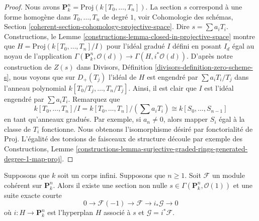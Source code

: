 \begin{proof}
Nous avons $\mathbf{P}^n_k = \text{Proj}(k[T_0,
\ldots, T_n])$. La section $s$ correspond à une
forme homogène dans $T_0, \ldots, T_n$ de degré
$1$, voir Cohomologie des schémas, Section
\ref{coherent-section-cohomology-projective-space}.
Dire $s = \sum a_i T_i$. Constructions, le Lemme
\ref{constructions-lemma-closed-in-projective-space}
montre que $H = \text{Proj}(k[T_0, \ldots, T_n]/I)$
pour l'idéal gradué $I$ défini en posant $I_d$ égal
au noyau de l'application $\Gamma(\mathbf{P}^n_k,
\mathcal{O}(d)) \to \Gamma(H, i^*\mathcal{O}(d))$.
D'après notre construction de $Z(s)$ dans Divisors,
Définition \ref{divisors-definition-zero-scheme-s},
nous voyons que sur $D_{+}(T_j)$ l'idéal de $H$ est
engendré par $\sum a_i T_i/T_j$ dans l'anneau polynomial
$k[T_0/T_j, \ldots, T_n/T_j]$. Ainsi, il est clair que
$I$ est l'idéal engendré par $\sum a_i T_i$. Remarquez que
$$
k[T_0, \ldots, T_n]/I = k[T_0, \ldots, T_n]/(\sum a_i T_i) \cong
k[S_0, \ldots, S_{n - 1}]
$$
en tant qu'anneaux gradués. Par exemple, si $a_n \not = 0$,
alors mapper $S_i$ égal à la classe de $T_i$ fonctionne.
Nous obtenons l'isomorphisme désiré par fonctorialité de
$\text{Proj}$. L'égalité des torsions de faisceaux de
structure découle par exemple des Constructions, Lemme
\ref{constructions-lemma-surjective-graded-rings-generated-degree-1-map-proj}.
\end{proof}

\begin{lemma}
\label{lemma-exact-sequence-induction}
Supposons que $k$ soit un corps infini.
Supposons que $n \geq 1$. Soit $\mathcal{F}$ un
module cohérent sur $\mathbf{P}^n_k$. Alors il
existe une section non nulle $s \in
\Gamma(\mathbf{P}^n_k, \mathcal{O}(1))$ et une suite exacte courte
$$
0 \to \mathcal{F}(-1) \to \mathcal{F} \to i_*\mathcal{G} \to 0
$$
où $i : H \to \mathbf{P}^n_k$ est l'hyperplan $H$
associé à $s$ et $\mathcal{G} = i^*\mathcal{F}$.
\end{lemma}

